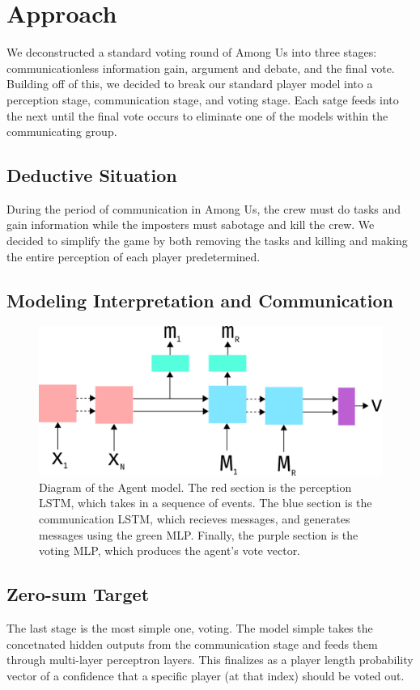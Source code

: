 \documentclass[10pt,twocolumn,letterpaper]{article}
\begin{document}
\section{Approach}
We deconstructed a standard voting round of Among Us into three stages: 
communicationless information gain,
argument and debate, and the final vote. Building off of this, we decided 
to break our standard player model into a perception stage, 
communication stage, and voting stage. Each satge feeds into the next until the final
vote occurs to eliminate one of the models within the communicating group.
\subsection{Deductive Situation}
During the period of communication in Among Us, the crew must do tasks
and gain information while the imposters must sabotage and kill the crew. We decided
to simplify the game by both removing the tasks and killing and making the entire
perception of each player predetermined.
\subsection{Modeling Interpretation and Communication}
\begin{figure}
   \begin{center}
      \includegraphics[width=0.8 \textwidth]{img/model.png}
   \end{center}
      \caption{Diagram of the Agent model. The red section is the perception LSTM,
      which takes in a sequence of events. The blue section is the communication
      LSTM, which recieves messages, and generates messages using the green MLP.
      Finally, the purple section is the voting MLP, which produces the agent's
      vote vector.}
   \label{fig:model}
\end{figure}
   
\subsection{Zero-sum Target}
The last stage is the most simple one, voting. The model simple takes the concetnated
hidden outputs from the communication stage and feeds them through
multi-layer perceptron layers. This finalizes as a player length probability vector
of a confidence that a specific player (at that index) should be voted out.
\end{document}
